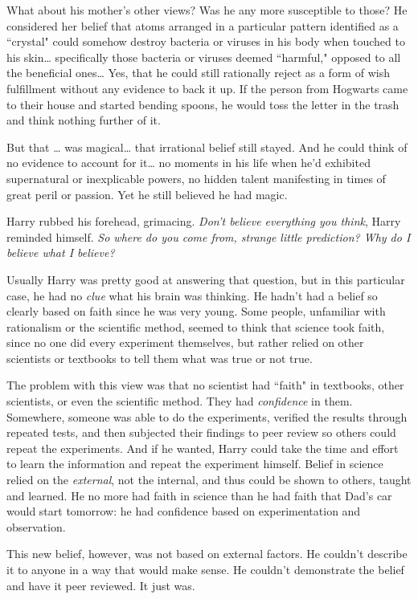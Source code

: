 What about his mother's other views? Was he any more susceptible to those? He considered her belief that atoms arranged in a particular pattern identified as a ``crystal" could somehow destroy bacteria or viruses in his body when touched to his skin{\ldots} specifically those bacteria or viruses deemed ``harmful," opposed to all the beneficial ones{\ldots} Yes, that he could still rationally reject as a form of wish fulfillment without any evidence to back it up. If the person from Hogwarts came to their house and started bending spoons, he would toss the letter in the trash and think nothing further of it.

But that {\ldots} was magical{\ldots} that irrational belief still stayed. And he could think of no evidence to account for it{\ldots} no moments in his life when he'd exhibited supernatural or inexplicable powers, no hidden talent manifesting in times of great peril or passion. Yet he still believed he had magic.

Harry rubbed his forehead, grimacing. \emph{Don't believe everything you think}, Harry reminded himself. \emph{So where do you come from, strange little prediction? Why do I believe what I believe?}

Usually Harry was pretty good at answering that question, but in this particular case, he had no \emph{clue} what his brain was thinking. He hadn't had a belief so clearly based on faith since he was very young. Some people, unfamiliar with rationalism or the scientific method, seemed to think that science took faith, since no one did every experiment themselves, but rather relied on other scientists or textbooks to tell them what was true or not true.

The problem with this view was that no scientist had ``faith" in textbooks, other scientists, or even the scientific method. They had \emph{confidence} in them. Somewhere, someone was able to do the experiments, verified the results through repeated tests, and then subjected their findings to peer review so others could repeat the experiments. And if he wanted, Harry could take the time and effort to learn the information and repeat the experiment himself. Belief in science relied on the \emph{external}, not the internal, and thus could be shown to others, taught and learned. He no more had faith in science than he had faith that Dad's car would start tomorrow: he had confidence based on experimentation and observation.

This new belief, however, was not based on external factors. He couldn't describe it to anyone in a way that would make sense. He couldn't demonstrate the belief and have it peer reviewed. It just was.

